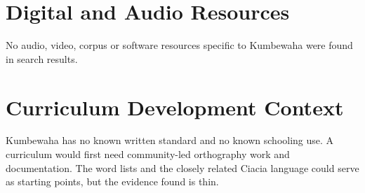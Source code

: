 \documentclass[12pt]{article}
\begin{document}
\section{Digital and Audio Resources}
No audio, video, corpus or software resources specific to Kumbewaha were found in search results.

\section{Curriculum Development Context}
Kumbewaha has no known written standard and no known schooling use. A curriculum would first need community-led orthography work and documentation. The word lists and the closely related Ciacia language could serve as starting points, but the evidence found is thin.
\end{document}
